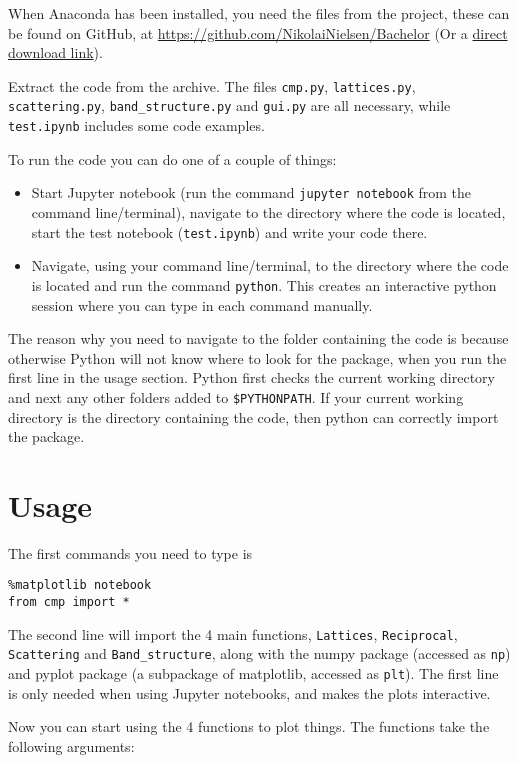 \documentclass[a4paper,11pt]{article}
\numberwithin{equation}{section}
\begin{document}
	When Anaconda has been installed, you need the files from the project, these can be found on GitHub, at \url{https://github.com/NikolaiNielsen/Bachelor} (Or a \href{https://github.com/NikolaiNielsen/Bachelor/archive/master.zip}{direct download link}).
	
	Extract the code from the archive. The files \texttt{cmp.py}, \texttt{lattices.py}, \texttt{scattering.py}, \texttt{band\_structure.py} and \texttt{gui.py} are all necessary, while \texttt{test.ipynb} includes some code examples.
	
	To run the code you can do one of a couple of things:
	\begin{itemize}
		\item Start Jupyter notebook (run the command \texttt{jupyter notebook} from the command line/terminal), navigate to the directory where the code is located, start the test notebook (\texttt{test.ipynb}) and write your code there.
		\item Navigate, using your command line/terminal, to the directory where the code is located and run the command \texttt{python}. This creates an interactive python session where you can type in each command manually.
	\end{itemize}
	The reason why you need to navigate to the folder containing the code is because otherwise Python will not know where to look for the package, when you run the first line in the usage section. Python first checks the current working directory and next any other folders added to \texttt{\$PYTHONPATH}. If your current working directory is the directory containing the code, then python can correctly import the package.
	
	
	\section{Usage}
	The first commands you need to type is
	\begin{lstlisting}
%matplotlib notebook
from cmp import *
	\end{lstlisting}
	The second line will import the 4 main functions, \texttt{Lattices}, \texttt{Reciprocal}, \texttt{Scattering} and \texttt{Band\_structure}, along with the numpy package (accessed as \texttt{np}) and pyplot package (a subpackage of matplotlib, accessed as \texttt{plt}). The first line is only needed when using Jupyter notebooks, and makes the plots interactive.
	
	Now you can start using the 4 functions to plot things. The functions take the following arguments:
\end{document}

